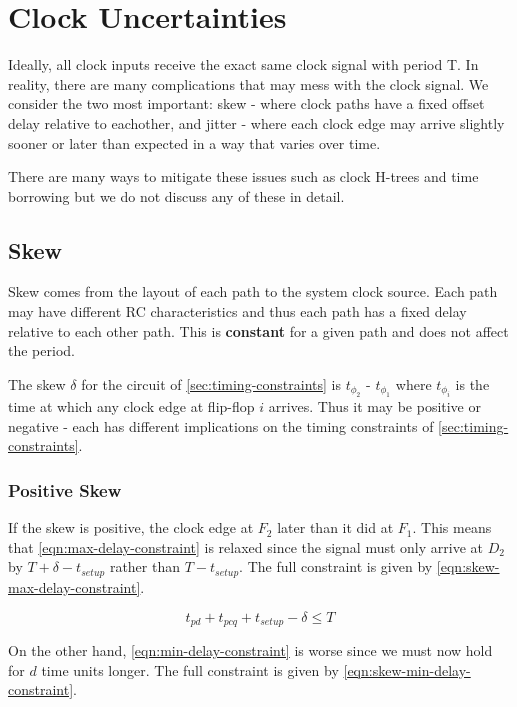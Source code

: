 \documentclass[11pt]{report}
\begin{document}
\section{Clock Uncertainties}
Ideally, all clock inputs receive the exact same clock signal with period T. In reality, there are many complications that may mess with the clock signal. We consider the two most important: skew - where clock paths have a fixed offset delay relative to eachother, and jitter - where each clock edge may arrive slightly sooner or later than expected in a way that varies over time.

There are many ways to mitigate these issues such as clock H-trees and time borrowing but we do not discuss any of these in detail.

\subsection{Skew}
Skew comes from the layout of each path to the system clock source. Each path may have different RC characteristics and thus each path has a fixed delay relative to each other path. This is \textbf{constant} for a given path and does not affect the period.

The skew $\delta$ for the circuit of \autoref{sec:timing-constraints} is $t_{\phi_2}$ - $t_{\phi_1}$ where $t_{\phi_i}$ is the time at which any clock edge at flip-flop $i$ arrives. Thus it may be positive or negative - each has different implications on the timing constraints of \autoref{sec:timing-constraints}.

\subsubsection{Positive Skew}
If the skew is positive, the clock edge at $F_2$ later than it did at $F_1$. This means that \autoref{eqn:max-delay-constraint} is relaxed since the signal must only arrive at $D_2$ by $T + \delta - t_{setup}$ rather than $T - t_{setup}$. The full constraint is given by \autoref{eqn:skew-max-delay-constraint}.

\begin{equation}
	\label{eqn:skew-max-delay-constraint}
	t_{pd} + t_{pcq} + t_{setup} - \delta \le T
\end{equation}

On the other hand, \autoref{eqn:min-delay-constraint} is worse since we must now hold for $d$ time units longer. The full constraint is given by \autoref{eqn:skew-min-delay-constraint}.
\end{document}
